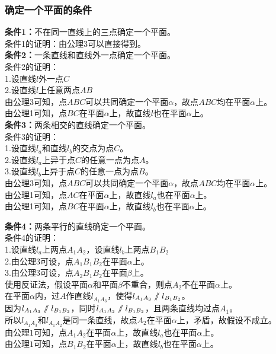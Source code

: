 \documentclass[UTF8]{ctexart}
\renewcommand\parallel{{\hspace{3.0pt}\mathrel{/\mskip-6.5mu/}\hspace{2.6pt}}}
\begin{document}
\subsubsection{确定一个平面的条件}
    \textbf{条件1：}不在同一直线上的三点确定一个平面。\\[3mm]
    条件1的证明：由公理3可以直接得到。\\[8mm]
    \textbf{条件2：}一条直线和直线外一点确定一个平面。\\[3mm]
    条件2的证明：\\[3mm]
    1.设直线$l$外一点$C$\\[2mm]
    2.设直线$l$上任意两点$AB$\\[3mm]
    由公理3可知，点$ABC$可以共同确定一个平面$\alpha$，故点$ABC$均在平面$\alpha$上。\\[2mm]
    由公理1可知，点$BC$在平面$\alpha$上，故直线$l$也在平面$\alpha$上。\\[8mm]
    \textbf{条件3：}两条相交的直线确定一个平面。\\[3mm]
    条件3的证明：\\[3mm]
    1.设直线$l_a$和直线$l_b$的交点为点$C$。\\[2mm]
    2.设直线$l_a$上异于点$C$的任意一点为点$A$。\\[2mm]
    3.设直线$l_b$上异于点$C$的任意一点为点$B$。\\[3mm]
    由公理3可知，点$ABC$可以共同确定一个平面$\alpha$，故点$ABC$均在平面$\alpha$上。\\[2mm]
    由公理1可知，点$AC$在平面$\alpha$上，故直线$l_a$也在平面$\alpha$上。\\[2mm]
    由公理1可知，点$BC$在平面$\alpha$上，故直线$l_b$也在平面$\alpha$上。

\newpage

    \textbf{条件4：}两条平行的直线确定一个平面。\\[3mm]
    条件4的证明：\\[3mm]
    1.设直线$l_a$上两点$A_1A_2$，设直线$l_b$上两点$B_1B_2$\\[2mm]
    2.由公理3可设，点$A_1B_1B_2$在平面$\alpha$上。\\[2mm]
    3.由公理3可设，点$A_2B_1B_2$在平面$\beta$上。\\[3mm]
    使用反证法，假设平面$\alpha$和平面$\beta$不重合，则点$A_2$不在平面$\alpha$上。\\[2mm]
    在平面$\alpha$内，过$A$作直线$l_{A_1A_3}$，使得$l_{A_1A_3}\parallel l_{B_1B_2}$。\\[2mm]
    因为$l_{A_1A_3}\parallel l_{B_1B_2}$，同时$l_{A_1A_2}\parallel l_{B_1B_2}$，且两条直线均过点$A_1$。\\[2mm]
    所以$l_{A_1A_3}$和$l_{A_1A_2}$是同一条直线，故点$A_2$在平面$\alpha$上，矛盾，故假设不成立。\\[2mm]
    由公理$1$可知，点$A_1A_2$在平面$\alpha$上，故直线$l_a$也在平面$\alpha$上。\\[2mm]
    由公理$1$可知，点$B_1B_2$在平面$\alpha$上，故直线$l_b$也在平面$\alpha$上。
\end{document}
